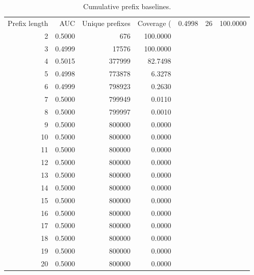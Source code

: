 \begin{table}
\caption{Cumulative prefix baselines.}
\label{tab:prefix_baselines}
\begin{tabular}{rrrr}
\toprule
Prefix length & AUC & Unique prefixes & Coverage (%
 & 0.4998 & 26 & 100.0000 \\
2 & 0.5000 & 676 & 100.0000 \\
3 & 0.4999 & 17576 & 100.0000 \\
4 & 0.5015 & 377999 & 82.7498 \\
5 & 0.4998 & 773878 & 6.3278 \\
6 & 0.4999 & 798923 & 0.2630 \\
7 & 0.5000 & 799949 & 0.0110 \\
8 & 0.5000 & 799997 & 0.0010 \\
9 & 0.5000 & 800000 & 0.0000 \\
10 & 0.5000 & 800000 & 0.0000 \\
11 & 0.5000 & 800000 & 0.0000 \\
12 & 0.5000 & 800000 & 0.0000 \\
13 & 0.5000 & 800000 & 0.0000 \\
14 & 0.5000 & 800000 & 0.0000 \\
15 & 0.5000 & 800000 & 0.0000 \\
16 & 0.5000 & 800000 & 0.0000 \\
17 & 0.5000 & 800000 & 0.0000 \\
18 & 0.5000 & 800000 & 0.0000 \\
19 & 0.5000 & 800000 & 0.0000 \\
20 & 0.5000 & 800000 & 0.0000 \\
\bottomrule
\end{tabular}
\end{table}
